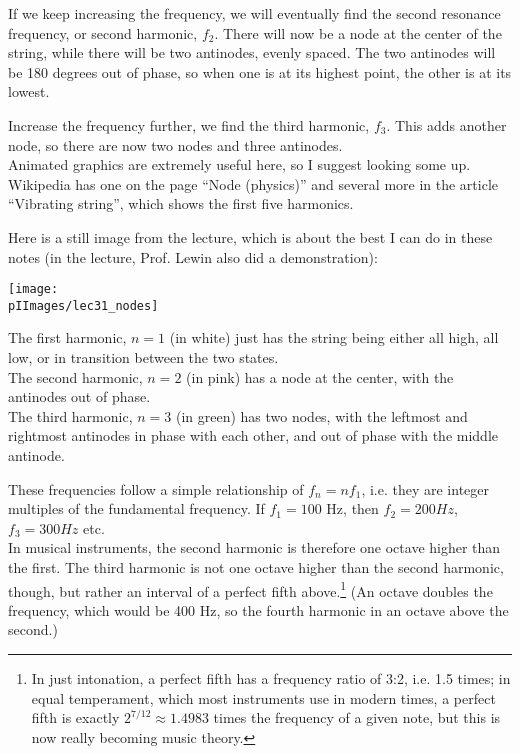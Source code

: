 If we keep increasing the frequency, we will eventually find the second resonance frequency, or second harmonic, $f_2$. There will now be a node at the center of the string, while there will be two antinodes, evenly spaced. The two antinodes will be 180 degrees out of phase, so when one is at its highest point, the other is at its lowest.

Increase the frequency further, we find the third harmonic, $f_3$. This adds another node, so there are now two nodes and three antinodes.\\
Animated graphics are extremely useful here, so I suggest looking some up. Wikipedia has one on the page ``Node (physics)'' and several more in the article ``Vibrating string'', which shows the first five harmonics.

Here is a still image from the lecture, which is about the best I can do in these notes (in the lecture, Prof. Lewin also did a demonstration):

\begin{center}
\texttt{[image: \\pIImages/lec31\_nodes]}
\end{center}

The first harmonic, $n=1$ (in white) just has the string being either all high, all low, or in transition between the two states.\\
The second harmonic, $n=2$ (in pink) has a node at the center, with the antinodes out of phase.\\
The third harmonic, $n=3$ (in green) has two nodes, with the leftmost and rightmost antinodes in phase with each other, and out of phase with the middle antinode.

These frequencies follow a simple relationship of $f_n = n f_1$, i.e. they are integer multiples of the fundamental frequency. If $f_1 = 100$ Hz, then $f_2 = 200 Hz$, $f_3 = 300 Hz$ etc.\\
In musical instruments, the second harmonic is therefore one octave higher than the first. The third harmonic is not one octave higher than the second harmonic, though, but rather an interval of a perfect fifth above.\footnote{In just intonation, a perfect fifth has a frequency ratio of 3:2, i.e. 1.5 times; in equal temperament, which most instruments use in modern times, a perfect fifth is exactly $2^{7/12} \approx 1.4983$ times the frequency of a given note, but this is now really becoming music theory.}  (An octave doubles the frequency, which would be 400 Hz, so the fourth harmonic in an octave above the second.)

